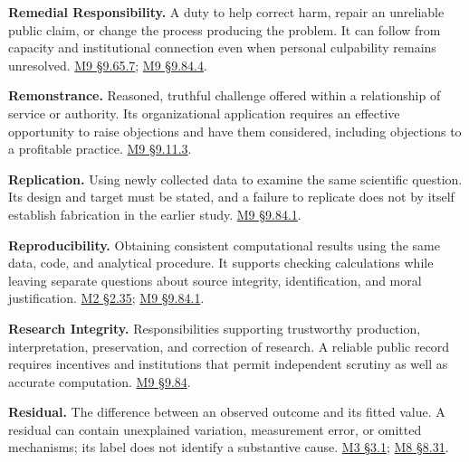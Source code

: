 \noindent\textbf{Remedial Responsibility.} A duty to help correct harm, repair an
unreliable public claim, or change the process producing the problem. It
can follow from capacity and institutional connection even when personal
culpability remains unresolved.
\hyperref[M09-responsibility-for-the-artifact-and-its-uses]{M9
§9.65.7};
\hyperref[M09-the-harm-and-the-duty-to-correct]{M9
§9.84.4}.

\noindent\textbf{Remonstrance.} Reasoned, truthful challenge offered within a
relationship of service or authority. Its organizational application
requires an effective opportunity to raise objections and have them
considered, including objections to a profitable practice.
\hyperref[M09-remonstrance-reciprocity-and-learning]{M9
§9.11.3}.

\noindent\textbf{Replication.} Using newly collected data to examine the same
scientific question. Its design and target must be stated, and a failure
to replicate does not by itself establish fabrication in the earlier
study.
\hyperref[M09-three-questions-about-a-research-claim]{M9
§9.84.1}.

\noindent\textbf{Reproducibility.} Obtaining consistent computational results
using the same data, code, and analytical procedure. It supports
checking calculations while leaving separate questions about source
integrity, identification, and moral justification.
\href{Marketing_Analytics_Lecture_Notes.pdf\#M02-reproducing-a-result-and-assessing-its-records}{M2
§2.35};
\hyperref[M09-three-questions-about-a-research-claim]{M9
§9.84.1}.

\noindent\textbf{Research Integrity.} Responsibilities supporting trustworthy
production, interpretation, preservation, and correction of research. A
reliable public record requires incentives and institutions that permit
independent scrutiny as well as accurate computation.
\hyperref[M09-misleading-research-replication-and-correction]{M9
§9.84}.

\noindent\textbf{Residual.} The difference between an observed outcome and its
fitted value. A residual can contain unexplained variation, measurement
error, or omitted mechanisms; its label does not identify a substantive
cause.
\href{Marketing_Analytics_Lecture_Notes.pdf\#M03-a-conditional-mean-and-a-regression-line}{M3
§3.1};
\href{Marketing_Analytics_Lecture_Notes.pdf\#M08-hbs-reassurance-and-misleading-research-communication}{M8
§8.31}.


